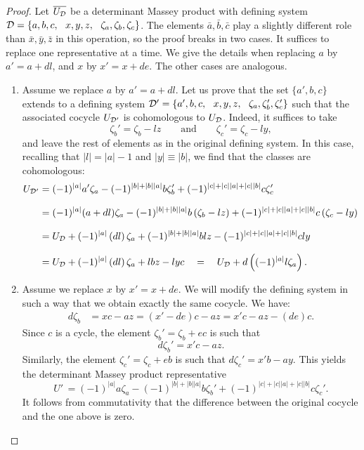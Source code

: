 \documentclass[11pt]{article}
\theoremstyle{definition}
\theoremstyle{definition}
\begin{document}
\begin{proof}
Let $\overline{U_{\mathcal D}}$ be a determinant Massey product 
with defining system $\mD=\left\{a,b,c,\ \ x,y,z,\ \ \zeta_a,\zeta_b,\zeta_c\right\}$.
The elements $\bar a,\bar b,\bar c$ play a 
slightly different role than $\bar x,\bar y,\bar z$ in this operation, so the proof breaks in two cases. 
It suffices to replace one representative at a time. 
We give the details when replacing $a$ by $a'=a+dl$, and $x$ by $x'=x+de$.
The other cases are analogous.
\begin{enumerate}
    \item[{(i)}] Assume we replace $a$ by $a' = a +dl$. 
    Let us prove that the set $\{a',b,c\}$ extends to a defining system
$\mD'=\left\{a',b,c,\ \ x,y,z,\ \ \zeta_a,\zeta_b',\zeta_c'\right\}$ 
such that the associated cocycle $U_{\mathcal D'}$ is cohomologous to $U_\mathcal D$.
Indeed, it suffices to take
\begin{equation*}
\zeta_b' = \zeta_b -lz \qquad \textrm{and} \qquad \zeta_c' = \zeta_c - ly,
\end{equation*}
and leave the rest of elements as in the original defining system.
In this case, recalling that $|l|=|a|-1$ and $|y|\equiv|b|$, we find that the classes are cohomologous:
\begin{align*}
    U_{\mathcal D'}  &= (-1)^{|a|}a'\zeta_a - (-1)^{|b| + |b||a|}b \zeta_b' + (-1)^{|c|+ |c||a| + |c||b| }c\zeta_c' \\[0.25cm]
        &= (-1)^{|a|}(a+dl)\zeta_a - (-1)^{|b| + |b||a|}b \left(\zeta_b -lz\right) 
        + (-1)^{|c|+ |c||a| + |c||b| }c\left(\zeta_c - ly\right) \\[0.25cm]
        &= U_\mathcal D + (-1)^{|a|} \left(dl\right) \zeta_a + (-1)^{|b|+|b||a|} blz - (-1)^{|c|+|c||a| + |c||b|} cly  \\[0.25cm]
        &= U_\mathcal D + (-1)^{|a|} \left(dl\right) \zeta_a +lbz - lyc \quad =\quad   U_\mathcal D + d\left( (-1)^{|a|}l\zeta_a \right). 
\end{align*}
\item[{(ii)}] Assume we replace $x$ by $x' = x +de$. 
We will modify the defining system in such a way that we obtain exactly the same cocycle.
We have:
\begin{align*}
    d\zeta_b    &= xc-az 
    = \left(x'-de\right)c-az 
    = x'c-az - (de)c.
\end{align*}
Since $c$ is a cycle, the element $\zeta_b' = \zeta_b + ec$ is such that  
\begin{equation*}
d\zeta_b' = x'c-az.
\end{equation*}
Similarly, the element $\zeta_c' = \zeta_c + eb$ is such that 
$d\zeta_c' = x'b-ay$.
This yields the determinant Massey product representative
\begin{equation*}
U' \,=(-1)^{|a|}a\zeta_a - (-1)^{|b| + |b||a|}b \zeta_b' + (-1)^{|c|+ |c||a| + |c||b| }c\zeta_c'.
\end{equation*}
It follows from commutativity that the difference between the original cocycle and the one above is zero.
\end{enumerate}
\end{proof}
\end{document}
